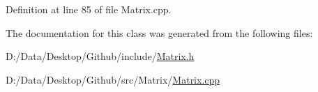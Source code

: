 Definition at line 85 of file Matrix.\+cpp.



The documentation for this class was generated from the following files\+:\begin{DoxyCompactItemize}
\item 
D\+:/\+Data/\+Desktop/\+Github/include/\hyperlink{_matrix_8h}{Matrix.\+h}\item 
D\+:/\+Data/\+Desktop/\+Github/src/\+Matrix/\hyperlink{_matrix_8cpp}{Matrix.\+cpp}\end{DoxyCompactItemize}
